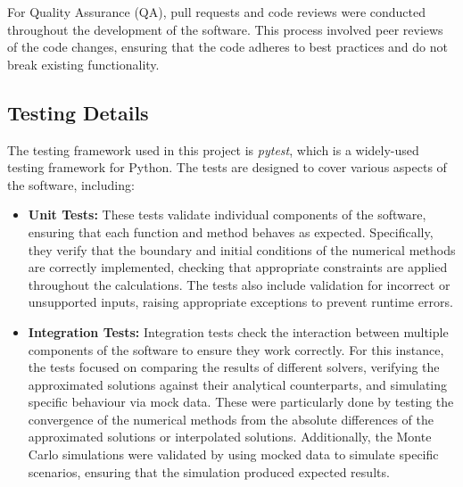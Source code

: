 For Quality Assurance (QA), pull requests and code reviews were conducted throughout the development of the software. This process involved peer reviews of the code changes, ensuring that the code adheres to best practices and do not break existing functionality.

\subsection{Testing Details}
The testing framework used in this project is \textit{pytest}, which is a widely-used testing framework for Python. The tests are designed to cover various aspects of the software, including:
\begin{itemize}
    \item \textbf{Unit Tests:} These tests validate individual components of the software, ensuring that each function and method behaves as expected. Specifically, they verify that the boundary and initial conditions of the numerical methods are correctly implemented, checking that appropriate constraints are applied throughout the calculations. The tests also include validation for incorrect or unsupported inputs, raising appropriate exceptions to prevent runtime errors.
    \item \textbf{Integration Tests:} Integration tests check the interaction between multiple components of the software to ensure they work correctly. For this instance, the tests focused on comparing the results of different solvers, verifying the approximated solutions against their analytical counterparts, and simulating specific behaviour via mock data. These were particularly done by testing the convergence of the numerical methods from the absolute differences of the approximated solutions or interpolated solutions. Additionally, the Monte Carlo simulations were validated by using mocked data to simulate specific scenarios, ensuring that the simulation produced expected results. 
\end{itemize}


